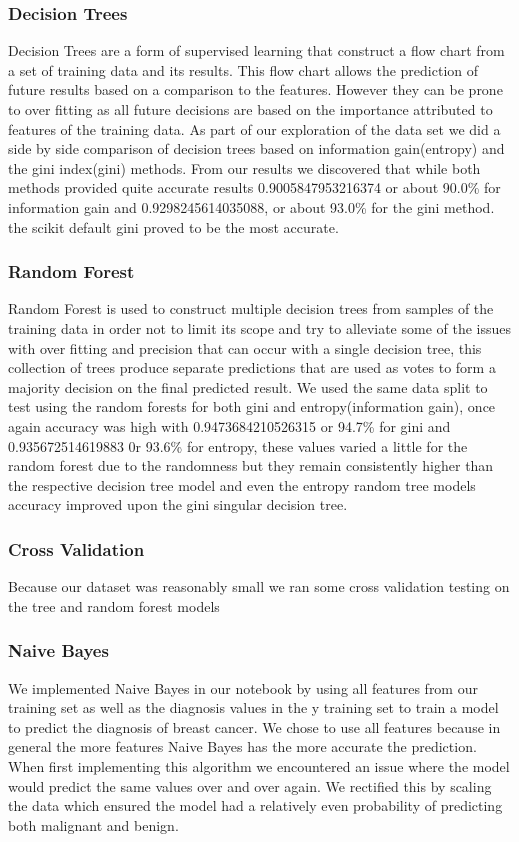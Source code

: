 \documentclass[conference]{IEEEtran}
\begin{document}
\subsubsection{Decision Trees}
Decision Trees are a form of supervised learning that construct a flow chart from a set of training data and its results. This flow chart allows the prediction of future results based on a comparison to the features. However they can be prone to over fitting as all future decisions are based on the importance attributed to features of the training data. As part of our exploration of the data set we did a side by side comparison of decision trees based on information gain(entropy) and the gini index(gini) methods.
From our results we discovered that while both methods provided quite accurate results 0.9005847953216374 or about 90.0\% for information gain and 0.9298245614035088, or about 93.0\% for the gini method. the scikit default gini proved to be the most accurate.
\subsubsection{Random Forest} Random Forest is used to construct multiple decision trees from samples of the training data in order not to limit its scope and try to alleviate some of the issues with over fitting and precision that can occur with a single decision tree, this collection of trees produce separate predictions that are used as votes to form a majority decision on the final predicted result. We used the same data split to test using the random forests for both gini and entropy(information gain), once again accuracy was high with 0.9473684210526315 or 94.7\% for gini and 0.935672514619883 0r 93.6\% for entropy, these values varied a little for the random forest due to the randomness but they remain consistently higher than the respective decision tree model and even the entropy random tree models accuracy improved upon the gini singular decision tree. 
\subsubsection{Cross Validation} Because our dataset was reasonably small we ran some cross validation testing on the tree and random forest models 
\subsubsection{Naive Bayes}
We implemented Naive Bayes in our notebook by using all features from our training set as well as the diagnosis values in the y training set to train a model to predict the diagnosis of breast cancer.  We chose to use all features because in general the more features Naive Bayes has the more accurate the prediction.  When first implementing this algorithm we encountered an issue where the model would predict the same values over and over again.  We rectified this by scaling the data which ensured the model had a relatively even probability of predicting both malignant and benign.
\end{document}
